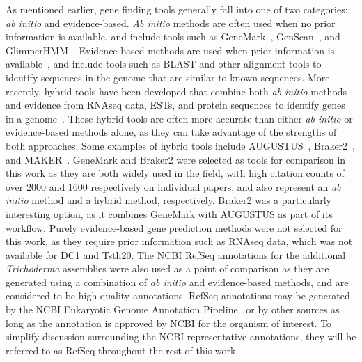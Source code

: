 As mentioned earlier, gene finding tools generally fall into one of two categories: \textit{ab initio} and evidence-based. \textit{Ab initio} methods are often used when no prior information is available, and include tools such as GeneMark~\cite{borodovsky2011a}, GenScan~\cite{burge1997}, and GlimmerHMM~\cite{majoros2004}. Evidence-based methods are used when prior information is available~\cite{ejigu2020a}, and include tools such as BLAST and other alignment tools to identify sequences in the genome that are similar to known sequences. More recently, hybrid tools have been developed that combine both \textit{ab initio} methods and evidence from RNAseq data, ESTs, and protein sequences to identify genes in a genome~\cite{ejigu2020a}. These hybrid tools are often more accurate than either \textit{ab initio} or evidence-based methods alone, as they can take advantage of the strengths of both approaches. Some examples of hybrid tools include AUGUSTUS~\cite{stanke2003}, Braker2~\cite{bruna2021a}, and MAKER~\cite{cantarel2008}. GeneMark and Braker2 were selected as tools for comparison in this work as they are both widely used in the field, with high citation counts of over 2000 and 1600 respectively on individual papers, and also represent an \textit{ab initio} method and a hybrid method, respectively. Braker2 was a particularly interesting option, as it combines GeneMark with AUGUSTUS as part of its workflow. Purely evidence-based gene prediction methods were not selected for this work, as they require prior information such as RNAseq data, which was not available for DC1 and Tsth20. The NCBI RefSeq annotations for the additional \textit{Trichoderma} assemblies were also used as a point of comparison as they are generated using a combination of \textit{ab initio} and evidence-based methods, and are considered to be high-quality annotations. RefSeq annotations may be generated by the NCBI Eukaryotic Genome Annotation Pipeline~\cite{zotero-item-367} or by other sources as long as the annotation is approved by NCBI for the organism of interest. To simplify discussion surrounding the NCBI representative annotations, they will be referred to as RefSeq throughout the rest of this work.

